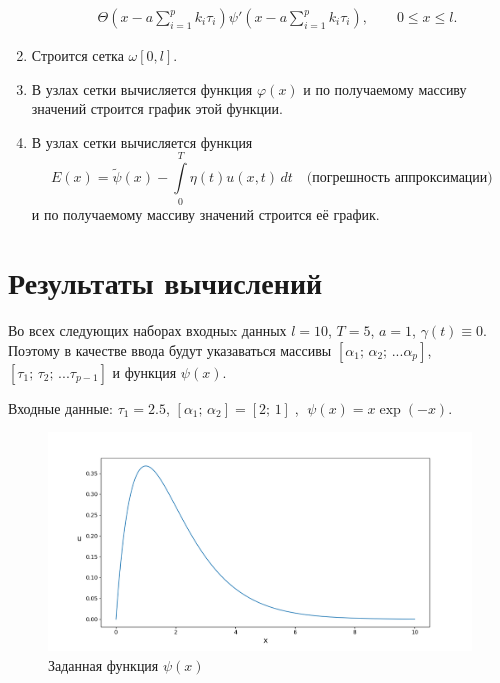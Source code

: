 \documentclass{article}
\renewcommand{\le}{\leqslant}
\theoremstyle{definition}
\begin{document}
\begin{enumerate}
\begin{equation*}
\begin{aligned}
	& \Theta\!\left(x - a\sum\limits_{i = 1}^{p}k_i\tau_i \right)\psi'\!\left(x - a\sum\limits_{i = 1}^{p}k_i\tau_i\right), 
	\qquad 0 \le x \le l.
	\end{aligned}
	\end{equation*}
	\item Строится сетка $\omega[0,l]$. 
	\item В узлах сетки вычисляется функция $\varphi(x)$ и по получаемому массиву значений 
	строится график этой функции.
	\item В узлах сетки вычисляется функция
	\begin{equation*}
		E(x) = \widetilde{\psi}(x) - \int\limits_0^T \eta(t)u(x,t) \,dt \quad \text{(погрешность аппроксимации)}
	\end{equation*}
	и по получаемому массиву значений строится её график.
\end{enumerate}

\newpage

\section{Результаты вычислений}
Во всех следующих наборах входныx данных $l = 10$,  $T = 5$,  $a = 1$, $\gamma(t) \equiv 0$.
Поэтому в качестве ввода будут указаваться массивы 
$[\alpha_1;\, \alpha_2;\, ... \alpha_p]$, $[\tau_1;\, \tau_2;\, ... \tau_{p-1}]$ и функция $\psi(x)$.

Входные данные: 
$\tau_1 = 2.5$, $[\alpha_1;\, \alpha_2] = [2;\, 1]\;$, $\;\psi(x) = x\exp(-x)$.
\begin{figure}[H]
	\centering
	\includegraphics[trim={2.1cm, 0.6cm, 0, 1.5cm}, clip, scale=0.615]{1_psi.png}
	\caption{Заданная функция $\psi(x)$}
	\label{fig:image1}
\end{figure}
\end{document}
